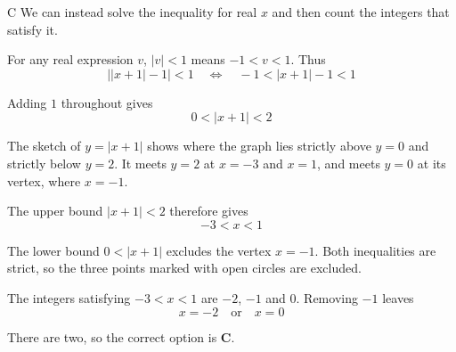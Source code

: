 \documentclass[11pt,a4paper]{article}
\begin{document}
\begin{enumerate}[label=\textbf{\arabic*.},leftmargin=*,itemsep=0pt,start=14]
\begin{djsSolution}{C}
We can instead solve the inequality for real $x$ and then count the integers that satisfy it.

For any real expression $v$, $|v|<1$ means $-1<v<1$. Thus
\[
\bigl||x+1|-1\bigr|<1
\quad\Longleftrightarrow\quad
-1<|x+1|-1<1
\]

Adding $1$ throughout gives
\[
0<|x+1|<2
\]

The sketch of $y=|x+1|$ shows where the graph lies strictly above $y=0$ and strictly below $y=2$. It meets $y=2$ at $x=-3$ and $x=1$, and meets $y=0$ at its vertex, where $x=-1$.

\begin{djsSolutionFigure}
\end{djsSolutionFigure}

The upper bound $|x+1|<2$ therefore gives
\[
-3<x<1
\]

The lower bound $0<|x+1|$ excludes the vertex $x=-1$. Both inequalities are strict, so the three points marked with open circles are excluded.

The integers satisfying $-3<x<1$ are $-2$, $-1$ and $0$. Removing $-1$ leaves
\[
x=-2\quad\text{or}\quad x=0
\]

There are two, so the correct option is \textbf{C}.
\end{djsSolution}
\end{enumerate}
\clearpage
\thispagestyle{djssolutions}
\vspace*{8pt}
\end{document}
